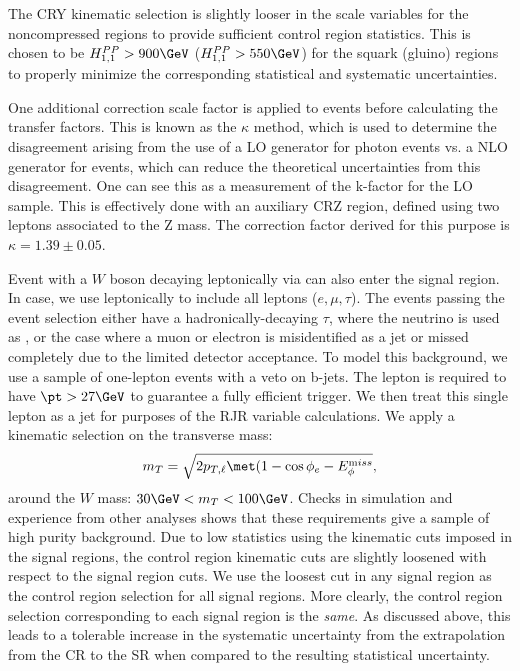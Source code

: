 The CRY kinematic selection is slightly looser in the scale variables for the noncompressed regions to provide sufficient control region statistics.
This is chosen to be $\HFnm{PP}{1}{1} > 900 \GeV$ ($\HFnm{PP}{1}{1} > 550 \GeV$) for the squark (gluino) regions to properly minimize the corresponding statistical and systematic uncertainties.
\begin{figure}
\caption{} \label{fig:boson_pt_ratio}
\end{figure}

One additional correction scale factor is applied to \gammajets events before calculating the transfer factors.
This is known as the $\kappa$ method, which is used to determine the disagreement arising from the use of a LO generator for photon events vs. a NLO generator for \zjets events, which can reduce the theoretical uncertainties from this disagreement. 
One can see this as a measurement of the k-factor for the LO \gammajets sample.
This is effectively done with an auxiliary CRZ region, defined using two leptons associated to the Z mass.
The correction factor derived for this purpose is $\kappa = 1.39 \pm 0.05$.

Event with a $W$ boson decaying leptonically via \wln can also enter the signal region.
In  case, we use leptonically to include all leptons ($e,\mu,\tau$).
The \wjets events passing the event selection either have a hadronically-decaying $\tau$, where the neutrino is used as \met, or the case where a muon or electron is misidentified as a jet or missed completely due to the limited detector acceptance.
To model this background, we use a sample of one-lepton events with a veto on b-jets.
The lepton is required to have $\pt > 27 \GeV$ to guarantee a fully efficient trigger.
We then treat this single lepton as a jet for purposes of the RJR variable calculations.
We apply a kinematic selection on the transverse mass:
\begin{align}
m_T = \sqrt{2p_{T,\ell} \met ( 1 - \cos{ \phi_{e} - \metphi } },
\end{align}
around the $W$ mass: $30 \GeV < m_T < 100 \GeV$.
Checks in simulation and experience from other analyses shows that these requirements give a sample of high purity \wln background.
Due to low statistics using the kinematic cuts imposed in the signal regions, the control region kinematic cuts are slightly loosened with respect to the signal region cuts.
We use the loosest cut in any signal region as the control region selection for all signal regions.
More clearly, the control region selection corresponding to each signal region is the \textit{same}.
As discussed above, this leads to a tolerable increase in the systematic uncertainty from the extrapolation from the CR to the SR when compared to the resulting statistical uncertainty.


